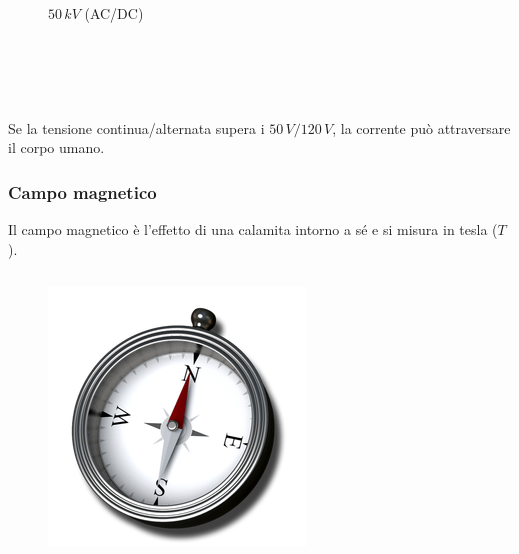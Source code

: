 \documentclass[handout]{beamer}
\theoremstyle{plain}
\begin{document}
\begin{frame}
\begin{columns}
\begin{column}{0.3\textwidth}
\begin{figure}
    $ 50 \, kV $ (AC/DC)
  \end{figure}    
  \end{column}
\end{columns}

~

~


Se la tensione continua/alternata supera i $ 50 \, V/120 \, V $, la corrente può attraversare il corpo umano.
\end{frame}





\begin{frame}
\frametitle{Campo magnetico}
Il campo magnetico è l'effetto di una calamita intorno a sé e si misura in tesla ($ T $).

\begin{columns}
  \begin{column}{0.3\textwidth}
  \begin{figure}
    \includegraphics[width=\columnwidth]{img/bussola.png}


\end{figure}
\end{column}
\end{columns}
\end{frame}
\end{document}
